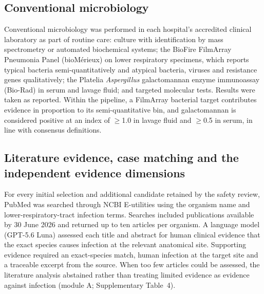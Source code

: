 \documentclass[11pt,a4paper]{article}
\newcommand{\filmarray}{FilmArray\xspace}
\begin{document}
\subsection*{Conventional microbiology}
Conventional microbiology was performed in each hospital's accredited clinical laboratory as part of routine care: culture with identification by mass spectrometry or automated biochemical systems; the BioFire \filmarray Pneumonia Panel (bioM\'erieux) on lower respiratory specimens, which reports typical bacteria semi-quantitatively and atypical bacteria, viruses and resistance genes qualitatively\cite{buchan2020practical,chou2025investigating}; the Platelia \textit{Aspergillus} galactomannan enzyme immunoassay (Bio-Rad) in serum and lavage fluid\cite{hung2021investigating}; and targeted molecular tests. Results were taken as reported. Within the pipeline, a \filmarray bacterial target contributes evidence in proportion to its semi-quantitative bin, and galactomannan is considered positive at an index of $\ge$1.0 in lavage fluid and $\ge$0.5 in serum, in line with consensus definitions\cite{donnelly2020revision}.

\subsection*{Literature evidence, case matching and the independent evidence dimensions}
For every initial selection and additional candidate retained by the safety review, PubMed was searched through NCBI E-utilities using the organism name and lower-respiratory-tract infection terms. Searches included publications available by 30 June 2026 and returned up to ten articles per organism. A language model (GPT-5.6 Luna) assessed each title and abstract for human clinical evidence that the exact species causes infection at the relevant anatomical site. Supporting evidence required an exact-species match, human infection at the target site and a traceable excerpt from the source. When too few articles could be assessed, the literature analysis abstained rather than treating limited evidence as evidence against infection (module A; Supplementary Table~4).
\end{document}
